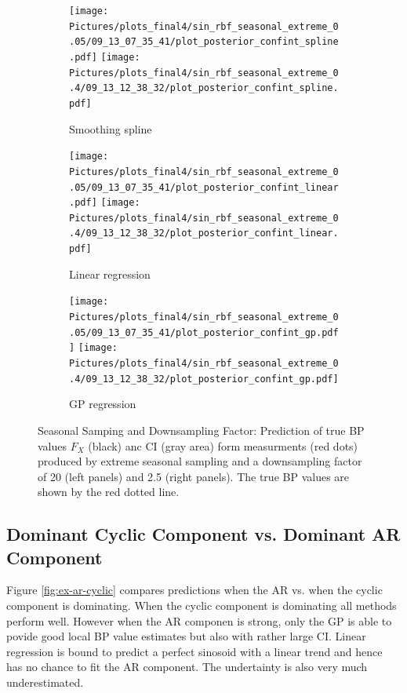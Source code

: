 \begin{figure}
\begin{subfigure}{\textwidth}
    \centering
    \texttt{[image: 
        Pictures/plots\_final4/sin\_rbf\_seasonal\_extreme\_0.05/09\_13\_07\_35\_41/plot\_posterior\_confint\_spline.pdf]}
    \texttt{[image: 
        Pictures/plots\_final4/sin\_rbf\_seasonal\_extreme\_0.4/09\_13\_12\_38\_32/plot\_posterior\_confint\_spline.pdf]}
  \caption{Smoothing spline}
\end{subfigure}

\begin{subfigure}{\textwidth}
    \centering
    \texttt{[image: 
        Pictures/plots\_final4/sin\_rbf\_seasonal\_extreme\_0.05/09\_13\_07\_35\_41/plot\_posterior\_confint\_linear.pdf]}
    \texttt{[image: 
        Pictures/plots\_final4/sin\_rbf\_seasonal\_extreme\_0.4/09\_13\_12\_38\_32/plot\_posterior\_confint\_linear.pdf]}
  \caption{Linear regression }
\end{subfigure}

\begin{subfigure}{\textwidth}
    \centering
    \texttt{[image: 
        Pictures/plots\_final4/sin\_rbf\_seasonal\_extreme\_0.05/09\_13\_07\_35\_41/plot\_posterior\_confint\_gp.pdf]}
    \texttt{[image: 
        Pictures/plots\_final4/sin\_rbf\_seasonal\_extreme\_0.4/09\_13\_12\_38\_32/plot\_posterior\_confint\_gp.pdf]}
  \caption{GP regression}
\end{subfigure}\hfill

\caption[Seasonal Samping and Downsampling Factor]{Seasonal Samping and Downsampling Factor:
    Prediction of true BP values $F_X$ (black)
    anc CI (gray area) form measurments (red dots) produced by extreme seasonal sampling and
    a downsampling factor of 20 (left panels) and 2.5 (right panels).
    The true BP values are shown by the red dotted line.}
\label{fig:ex-seasonal-sampling}
\end{figure}



\subsection{Dominant Cyclic Component vs. Dominant AR Component}

Figure \ref{fig:ex-ar-cyclic} compares
predictions when the AR vs. when the cyclic component is dominating.
When the cyclic component is dominating
all methods perform well.
However when the AR componen is strong, only the GP is able
to povide good local BP value estimates but also
with rather large CI.
Linear regression is bound to predict a perfect sinosoid with a linear
trend and hence has no chance to fit the AR component.
The undertainty is also very much underestimated.


